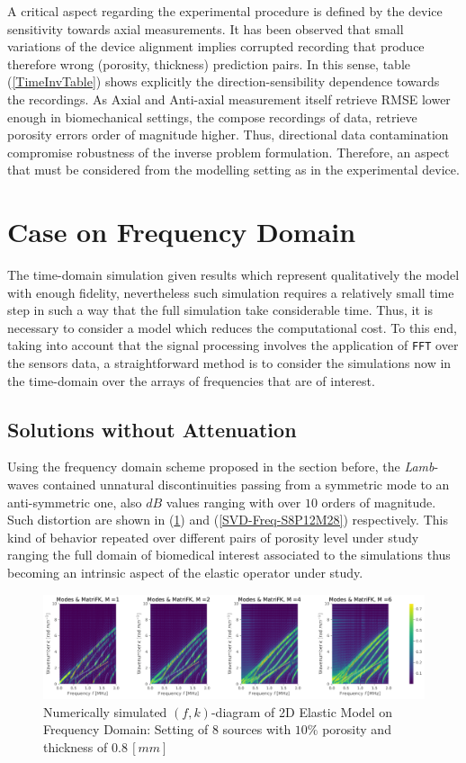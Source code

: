A critical aspect regarding the experimental procedure is defined by the device sensitivity towards axial measurements. It has been observed that small variations of the device alignment implies corrupted recording that produce therefore wrong (porosity, thickness) prediction pairs.
In this sense, table (\ref{TimeInvTable}) shows explicitly the direction-sensibility dependence towards the recordings. As Axial and Anti-axial measurement itself retrieve RMSE lower enough in biomechanical settings, the compose recordings of data, retrieve porosity errors order of magnitude higher. Thus, directional data contamination compromise robustness of the inverse problem formulation. Therefore, an aspect that must be considered from the modelling setting as in the experimental device.


\section{Case on Frequency Domain}

The time-domain simulation given results which represent qualitatively the model with enough fidelity, nevertheless such simulation requires a relatively small time step in such a way that the full simulation take considerable time. Thus, it is necessary to consider a model which reduces the computational cost.
To this end, taking into account that the signal processing involves the application of \texttt{FFT} over the sensors data, a straightforward method is to consider the simulations now in the time-domain over the arrays of frequencies that are of interest.

\subsection{Solutions without Attenuation}
Using the frequency domain scheme proposed in the section before, the \textit{Lamb}-waves contained unnatural discontinuities passing from a symmetric mode to an anti-symmetric one, also $dB$ values ranging with over $10$ orders of magnitude. Such distortion are shown in (\ref{FK-Freq-DiagramS8P12M28}) and (\ref{SVD-Freq-S8P12M28}) respectively. This kind of behavior repeated over different pairs of porosity level under study ranging the full domain of biomedical interest associated to the simulations thus becoming an intrinsic aspect of the elastic operator under study.

\begin{figure}[!h]
	\centering
	\includegraphics[width=\textwidth]{images/FreqRes/2DFreqS8P12ElasticFK28M400_y.pdf}
	\caption{Numerically simulated $(f,k)$-diagram of 2D Elastic Model on Frequency Domain: Setting of 8 sources with $10\%$ porosity and thickness of $0.8 \,[mm]$}
	\label{FK-Freq-DiagramS8P12M28}
\end{figure} 

